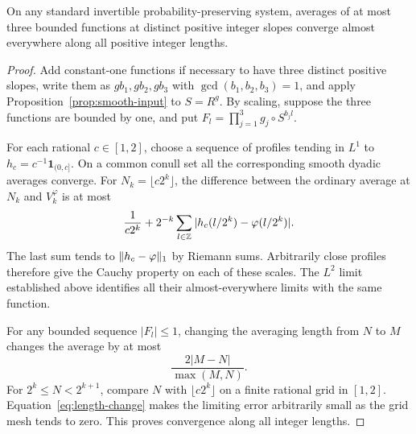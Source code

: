 \begin{lemma}\label{lem:triple-convergence}
On any standard invertible probability-preserving system, averages
of at most three bounded functions at distinct positive integer
slopes converge almost everywhere along all positive integer lengths.
\end{lemma}
\begin{proof}
Add constant-one functions if necessary to have three distinct
positive slopes, write them as $gb_1,gb_2,gb_3$ with
$\gcd(b_1,b_2,b_3)=1$, and apply
Proposition~\ref{prop:smooth-input} to $S=R^g$. By scaling, suppose
the three functions are bounded by one, and put
$F_l=\prod_{j=1}^3g_j\circ S^{b_jl}$.

For each rational $c\in[1,2]$, choose a sequence of profiles tending
in $L^1$ to $h_c=c^{-1}\mathbf1_{(0,c]}$. On a common conull set
all the corresponding smooth dyadic averages converge. For
$N_k=\lfloor c2^k\rfloor$, the difference between the ordinary
average at $N_k$ and $V_k^\varphi$ is at most
\[
 \frac1{c2^k}
 +2^{-k}\sum_{l\in\mathbb Z}|h_c(l/2^k)-\varphi(l/2^k)|.
\]
The last sum tends to $\lVert h_c-\varphi\rVert_1$ by Riemann sums.
Arbitrarily close profiles therefore give the Cauchy property on
each of these scales. The $L^2$ limit established above identifies
all their almost-everywhere limits with the same function.

For any bounded sequence $|F_l|\le1$, changing the averaging length
from $N$ to $M$ changes the average by at most
\begin{equation}\label{eq:length-change}
                 \frac{2|M-N|}{\max(M,N)}.
\end{equation}
For $2^k\le N<2^{k+1}$, compare $N$ with
$\lfloor c2^k\rfloor$ on a finite rational grid in $[1,2]$.
Equation~\eqref{eq:length-change} makes the limiting error
arbitrarily small as the grid mesh tends to zero. This proves
convergence along all integer lengths.
\end{proof}
